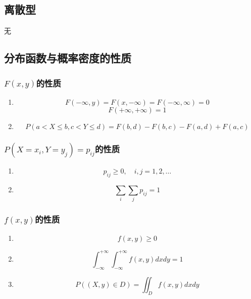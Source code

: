 \subsection{离散型}
无


\subsection{分布函数与概率密度的性质} %
\label{sub:性质}
\subsubsection{$F(x,y)$的性质}
\begin{enumerate}
	\item
	\begin{equation}
		F(-\infty, y) = F(x, -\infty) = F(-\infty, \infty) = 0
	\end{equation}
	\begin{equation}
		F(+\infty, +\infty) = 1
	\end{equation}

	\item 
	\begin{equation}
		P(a<X\leq b, c<Y\leq d) = F(b,d) - F(b,c) - F(a,d) + F(a,c)
	\end{equation}
\end{enumerate}

\subsubsection{$P(X=x_i, Y=y_j)=p_{ij}$的性质}
\begin{enumerate}
	\item 
	\begin{equation}
		p_{ij} \geq 0, \quad i,j = 1,2, \dots
	\end{equation}

	\item 
	\begin{equation}
		\sum_i \sum_j p_{ij} = 1
	\end{equation}
\end{enumerate}

\subsubsection{$f(x,y)$的性质}
\begin{enumerate}
	\item 
	\begin{equation}
		f(x, y) \geq 0
	\end{equation}
	\item 
	\begin{equation}
		\int_{-\infty}^{+\infty} \int_{-\infty}^{+\infty}f(x,y)dxdy = 1
	\end{equation}
	\item 
	\begin{equation}
		P((X,y)\in D) = \iint_Df(x,y) dxdy
	\end{equation}
	
\end{enumerate}


